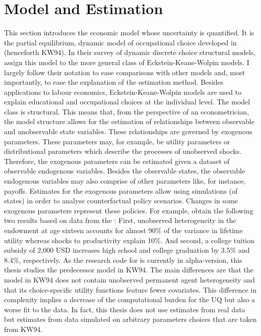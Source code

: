 \newpage %

\section{Model and Estimation}
\thispagestyle{plain} %
This section introduces the economic model whose uncertainty is quantified. It is the partial equilibrium, dynamic model of occupational choice developed in \cite{Keane.1994} (henceforth KW94). In their survey of dynamic discrete choice structural models, \cite{Aguirregabiria.2010} assign this model to the more general class of Eckstein-Keane-Wolpin models. I largely follow their notation to ease comparisons with other models and, most importantly, to ease the explanation of the estimation method. Besides applications to labour economics, Eckstein-Keane-Wolpin models are used to explain educational and occupational choices at the individual level. The model class is structural. This means that, from the perspective of an econometrician, the model structure allows for the estimation of relationships between observable and unobservable state variables. These relationships are governed by exogenous parameters. These parameters may, for example, be utility parameters or distributional parameters which describe the processes of unobserved shocks. Therefore, the exogenous parameters can be estimated given a dataset of observable endogenous variables. Besides the observable states, the observable endogenous variables may also comprise of other parameters like, for instance, payoffs. Estimates for the exogenous parameters allow using simulations (of states) in order to analyse counterfactual policy scenarios. Changes in some exogenous parameters represent these policies. For example, \cite{Keane.1997} obtain the following two results based on data from the : First, unobserved heterogeneity in the endowment at age sixteen accounts for almost 90\% of the variance in lifetime utility whereas shocks to productivity explain 10\%. And second, a college tuition subsidy of 2,000 USD increases high school and college graduation by 3.5\% and 8.4\%, respectively. As the research code for \cite{Keane.1997} is currently in alpha-version, this thesis studies the predecessor model in KW94. The main differences are that the model in KW94 does not contain unobserved permanent agent heterogeneity and that its choice-specific utility functions feature fewer covariates. This difference in complexity implies a decrease of the computational burden for the UQ but also a worse fit to the data. In fact, this thesis does not use estimates from real data but estimates from data simulated on arbitrary parameters choices that are taken from KW94.

